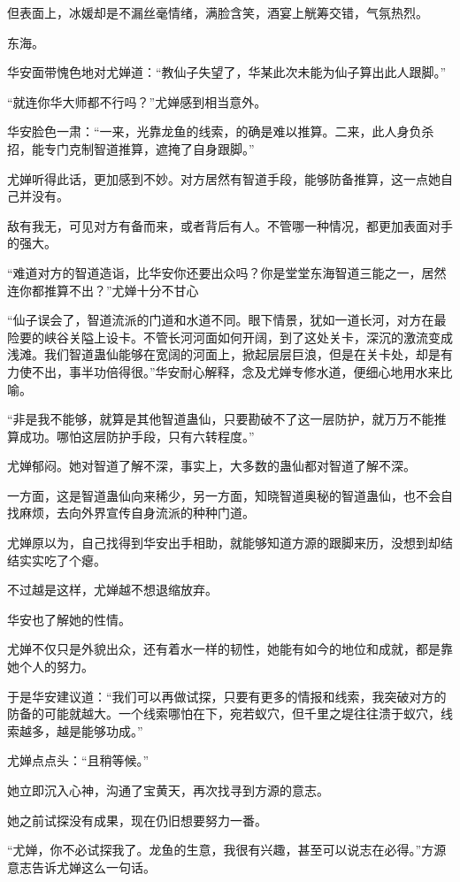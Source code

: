 \begin{this_body}
但表面上，冰媛却是不漏丝毫情绪，满脸含笑，酒宴上觥筹交错，气氛热烈。

东海。

华安面带愧色地对尤婵道：“教仙子失望了，华某此次未能为仙子算出此人跟脚。”

“就连你华大师都不行吗？”尤婵感到相当意外。

华安脸色一肃：“一来，光靠龙鱼的线索，的确是难以推算。二来，此人身负杀招，能专门克制智道推算，遮掩了自身跟脚。”

尤婵听得此话，更加感到不妙。对方居然有智道手段，能够防备推算，这一点她自己并没有。

敌有我无，可见对方有备而来，或者背后有人。不管哪一种情况，都更加表面对手的强大。

“难道对方的智道造诣，比华安你还要出众吗？你是堂堂东海智道三能之一，居然连你都推算不出？”尤婵十分不甘心

“仙子误会了，智道流派的门道和水道不同。眼下情景，犹如一道长河，对方在最险要的峡谷关隘上设卡。不管长河河面如何开阔，到了这处关卡，深沉的激流变成浅滩。我们智道蛊仙能够在宽阔的河面上，掀起层层巨浪，但是在关卡处，却是有力使不出，事半功倍得很。”华安耐心解释，念及尤婵专修水道，便细心地用水来比喻。

“非是我不能够，就算是其他智道蛊仙，只要勘破不了这一层防护，就万万不能推算成功。哪怕这层防护手段，只有六转程度。”

尤婵郁闷。她对智道了解不深，事实上，大多数的蛊仙都对智道了解不深。

一方面，这是智道蛊仙向来稀少，另一方面，知晓智道奥秘的智道蛊仙，也不会自找麻烦，去向外界宣传自身流派的种种门道。

尤婵原以为，自己找得到华安出手相助，就能够知道方源的跟脚来历，没想到却结结实实吃了个瘪。

不过越是这样，尤婵越不想退缩放弃。

华安也了解她的性情。

尤婵不仅只是外貌出众，还有着水一样的韧性，她能有如今的地位和成就，都是靠她个人的努力。

于是华安建议道：“我们可以再做试探，只要有更多的情报和线索，我突破对方的防备的可能就越大。一个线索哪怕在下，宛若蚁穴，但千里之堤往往溃于蚁穴，线索越多，越是能够功成。”

尤婵点点头：“且稍等候。”

她立即沉入心神，沟通了宝黄天，再次找寻到方源的意志。

她之前试探没有成果，现在仍旧想要努力一番。

“尤婵，你不必试探我了。龙鱼的生意，我很有兴趣，甚至可以说志在必得。”方源意志告诉尤婵这么一句话。


\end{this_body}
